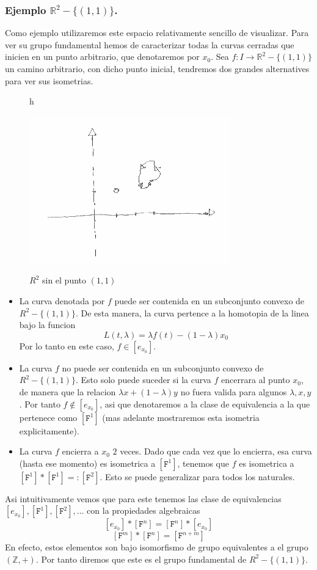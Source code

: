 \subsubsection{Ejemplo \(\mathbb{R}^2 - \{(1,1)\}\).}
Como ejemplo utilizaremos este espacio relativamente sencillo de
visualizar. Para ver su grupo fundamental hemos de caracterizar todas la
curvas cerradas que inicien en un punto arbitrario, que denotaremos por
\(x_0\). Sea \(f : I \to \mathbb{R}^2 - \{(1,1)\}\) un camino
arbitrario, con dicho punto inicial, tendremos dos grandes alternatives
para ver sus isometrias.
\begin{figure}{h}
  \caption{\(R^2\) sin el punto \((1,1)\)}
  \centering
  \includegraphics[scale=0.5]{./imagenes/R2-sin-un-punto.png}
  \label{fig:R2-sin-punto}
\end{figure}
\begin{itemize}
\item La curva denotada por \(f\) puede ser contenida en un subconjunto
  convexo de \(R^2 - \{(1,1)\}\). De esta manera, la curva pertence a la
  homotopia de la linea bajo la funcion
  \[ L (t,\lambda) = \lambda f (t) - (1 - \lambda) x_0\]
  Por lo tanto en este caso, \(f \in [e_{x_0}]\).
\item La curva \(f\) no puede ser contenida en un subconjunto convexo de
  \(R^2 - \{ (1,1)\}\). Esto solo puede suceder si la curva \(f\)
  encerrara al punto \(x_0\), de manera que la relacion \(\lambda x +
  (1 - \lambda) y\) no fuera valida para algunos \(\lambda, x, y\). Por
  tanto \(f \not \in [e_{x_0}]\), asi que denotaremos a la clase de
  equivalencia a la que pertenece como \([\mathtt{F}^1]\) (mas adelante
  mostraremos esta isometria explicitamente).
\item La curva \(f\) encierra a \(x_0\) \(2\) veces. Dado que cada vez
  que lo encierra, esa curva (hasta ese momento) es isometrica a
  \([\mathtt F ^1]\), tenemos que \(f\) es isometrica a \( [\mathtt F
  ^1] * [\mathtt F ^1] =: [\mathtt F ^2]\). Esto se puede generalizar
  para todos los naturales.
\end{itemize}
Asi intuitivamente vemos que para este tenemos las clase de
equivalencias \([e_{x_0}], [\mathtt F ^1], [\mathtt F ^2], \dots \) con
la propiedades algebraicas
\[ [e_{x_0}] * [\mathtt F ^n] = [\mathtt F ^n] * [e_{x_0}]\]
\[ [\mathtt F ^m]  * [\mathtt F ^n] = [\mathtt F ^{n + m}]\]
En efecto, estos elementos son bajo isomorfismo de grupo equivalentes a
el grupo \((\mathbb{Z}, +)\). Por tanto diremos que este es el grupo
fundamental de \(R^2 - \{(1,1)\}\).

